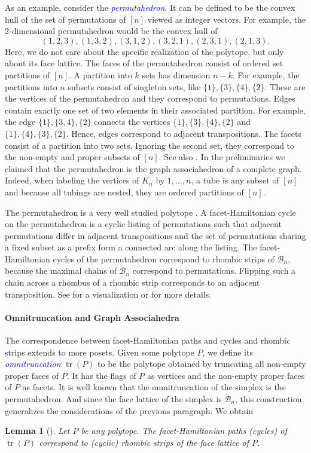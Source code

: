 \documentclass[fontsize=11pt,a4paper,DIV=12]{scrartcl}
\newcommand{\defn}[1]{\textsl{\textcolor{Blue}{#1}}}
\newtheorem{lemma}[theorem]{Lemma}
\DeclareMathOperator{\tr}{tr}
\begin{document}
As an example, consider the \defn{permutahedron}. It can be defined to be the convex hull of the set of permutations of $[n]$ viewed as integer vectors. For example, the 2-dimensional permutahedron would be the convex hull of
\[
	(1,2,3),(1,3,2),(3,1,2),(3,2,1),(2,3,1),(2,1,3).
\]
Here, we do not care about the specific realization of the polytope, but only about its face lattice. The faces of the permutahedron consist of ordered set partitions of $[n]$. A partition into $k$ sets has dimension $n-k$. For example, the partitions into $n$ subsets consist of singleton sets, like $\{1\},\{3\},\{4\},\{2\}$. These are the vertices of the permutahedron and they correspond to permutations. Edges contain exactly one set of two elements in their associated partition. For example, the edge $\{1\},\{3,4\},\{2\}$ connects the vertices $\{1\},\{3\},\{4\},\{2\}$ and $\{1\},\{4\},\{3\},\{2\}$. Hence, edges correspond to adjacent transpositions. The facets consist of a partition into two sets. Ignoring the second set, they correspond to the non-empty and proper subsets of $[n]$. See also . In the preliminaries we claimed that the permutahedron is the graph associahedron of a complete graph. Indeed, when labeling the vertices of $K_n$ by $1,\ldots,n$, a tube is any subset of $[n]$ and because all tubings are nested, they are ordered partitions of $[n]$.

The permutahedron is a very well studied polytope \cite{Permutahedra_associahedra_beyond, Permutahedron_and_gen_associahedron}. A facet-Hamiltonian cycle on the permutahedron is a cyclic listing of permutations such that adjacent permutations differ in adjacent transpositions and the set of permutations sharing a fixed subset as a prefix form a connected arc along the listing. The facet-Hamiltonian cycles of the permutahedron correspond to rhombic strips of $\mathcal B_n$, because the maximal chains of $\mathcal B_n$ correspond to permutations. Flipping such a chain across a rhombus of a rhombic strip corresponds to an adjacent transposition. See  for a visualization or \cite{facethamiltonicity} for more details.

\paragraph{Omnitruncation and Graph Associahedra}
The correspondence between facet-Hamiltonian paths and cycles and rhombic strips extends to more posets. Given some polytope $P$, we define its \defn{omnitruncation} $\tr(P)$ to be the polytope obtained by truncating all non-empty proper faces of $P$. It has the flags of $P$ as vertices and the non-empty proper faces of $P$ as facets. It is well known that the omnitruncation of the simplex is the permutahedron. And since the face lattice of the simplex is $\mathcal B_n$, this construction generalizes the considerations of the previous paragraph. We obtain
\begin{lemma}[\cite{facethamiltonicity}]
	Let $P$ be any polytope. The facet-Hamiltonian paths (cycles) of $\tr(P)$ correspond to (cyclic) rhombic strips of the face lattice of $P$.
\end{lemma}
\end{document}
